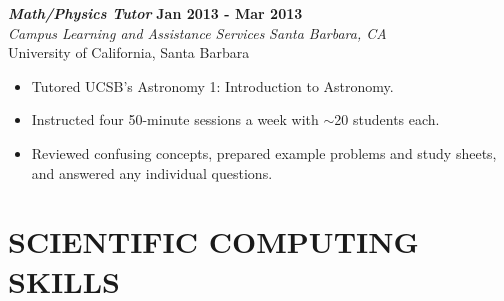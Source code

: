 \documentclass[margin, 10pt]{style/res} %
\begin{document}
\begin{resume}

{\sl\bf Math/Physics Tutor} \hfill {\bf Jan 2013 - Mar 2013} \\
{\sl Campus Learning and Assistance Services} \hfill {\sl Santa Barbara, CA}\\
University of California, Santa Barbara
\vspace{2pt}
\begin{itemize}[leftmargin=4ex] \itemsep -2pt
\item Tutored UCSB's Astronomy 1: Introduction to Astronomy. 		
\item Instructed four 50-minute sessions a week with $\sim$20 students each.
\item Reviewed confusing concepts, prepared example problems and study sheets, and answered any individual questions.
\end{itemize} 







\section{\small{SCIENTIFIC COMPUTING \\ SKILLS}}


\end{resume}
\end{document}
